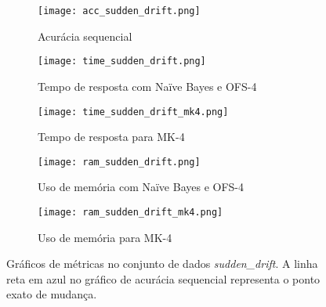 \begin{figure}[!htb]
\centering
\begin{subfigure}{0.5\textwidth}
\texttt{[image: acc\_sudden\_drift.png]}
\caption{Acurácia sequencial} \label{fig:sudden_1a}
\end{subfigure}
\hfill
\begin{minipage}[b]{\textwidth} 
\begin{subfigure}[t]{0.485\textwidth}
\texttt{[image: time\_sudden\_drift.png]}
\caption{Tempo de resposta com Naïve Bayes e OFS-4} \label{fig:sudden_1b}
\end{subfigure}
\hfill
\begin{subfigure}[t]{0.485\textwidth}
\texttt{[image: time\_sudden\_drift\_mk4.png]}
\caption{Tempo de resposta para MK-4} \label{fig:sudden_1c}
\end{subfigure}
\hfill
\begin{subfigure}[t]{0.485\textwidth}
\texttt{[image: ram\_sudden\_drift.png]}
\caption{Uso de memória com Naïve Bayes e OFS-4} \label{fig:sudden_1d}
\end{subfigure}
\hfill
\begin{subfigure}[t]{0.485\textwidth}
\texttt{[image: ram\_sudden\_drift\_mk4.png]}
\caption{Uso de memória para MK-4} \label{fig:sudden_1e}
\end{subfigure}
\end{minipage}

\caption[Gráficos de métricas no conjunto de dados \textit{sudden\_drift}]{Gráficos de métricas no conjunto de dados \textit{sudden\_drift}. A linha reta em azul no gráfico de acurácia sequencial representa o ponto exato de mudança. %
} \label{fig:sudden_drift}
\end{figure}



